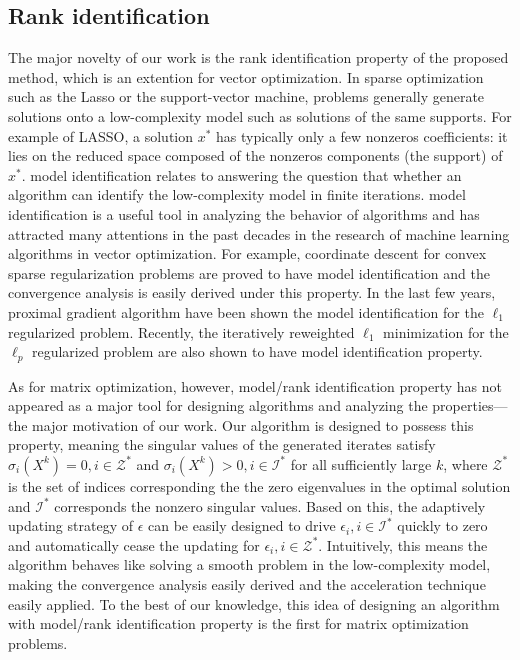 \documentclass[twoside,11pt]{article}
\numberwithin{equation}{section}
\begin{document}
\subsection{Rank identification}

The major novelty of our work is the rank identification property of the proposed method, which is an extention for vector optimization. 
In sparse optimization  such as the Lasso or the support-vector machine,  problems generally generate solutions onto  a low-complexity model such as solutions of the same supports.
For example of LASSO, a solution $x^{*}$ has typically only a few nonzeros coefficients: it lies on the reduced space composed of the nonzeros components (the support) of $x^*$. 
model identification relates to answering the question that whether an algorithm  can  identify the low-complexity model in finite iterations. 
model identification  is a useful tool in analyzing the behavior of algorithms and has attracted many attentions in the past decades in the research of machine learning algorithms in vector optimization. 
For example, coordinate descent for convex sparse regularization problems \cite{klopfenstein2020model, ModelID_LASSO_AccCD_2018} are proved to have model identification and the convergence analysis is easily derived under this property.
In the last few years, proximal gradient algorithm have been shown  \cite{ModelID_ProxGD_L1_2011, ModelID_LLcvgc_L1_2014,ModelID_LLcvgc_L1_2017} the model identification for the $\ell_{1}$ regularized problem.
Recently, the iteratively reweighted $\ell_{1}$ minimization  for the $\ell_{p}$ regularized  problem are also shown \cite{Zeng_Acc_2022,zenghao_lp2l1_adaEps_paper1}   to have model identification property. 

As for matrix optimization, however, model/rank identification property has not appeared as a major tool for designing algorithms and analyzing the properties---the major motivation of our work.  
Our algorithm is designed to possess this property, meaning the singular values of the generated  iterates  satisfy $\sigma_{i}(X^{k}) = 0,i\in\mathcal{Z}^{*}$ and $\sigma_{i}(X^{k}) > 0,i\in\mathcal{I}^{*}$ for all sufficiently large $k$, where $\mathcal{Z}^{*}$ is the set of indices corresponding the the zero eigenvalues in the optimal solution and  $\mathcal{I}^{*}$  corresponds the nonzero singular values.  
Based on this, the adaptively  updating strategy of $\epsilon$ can be easily designed to drive $\epsilon_i, i\in\mathcal{I}^*$ quickly to zero and automatically cease the updating for $\epsilon_i, i\in\mathcal{Z}^*$.  
Intuitively, this means the algorithm behaves like solving a smooth problem in the low-complexity model, making the convergence analysis easily derived and the acceleration technique easily applied. 
To the best of  our knowledge,  this idea  of designing  an algorithm with model/rank identification  property is the first for  matrix optimization problems.
\end{document}
